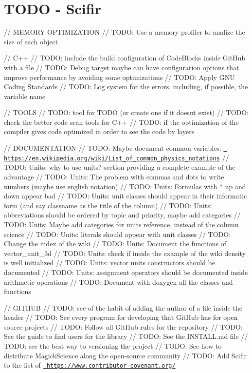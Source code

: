 \chapter{TODO -\/ Scifir}
\hypertarget{md_TODO_01-_01Scifir}{}\label{md_TODO_01-_01Scifir}
// MEMORY OPTIMIZATION // TODO\+: Use a memory profiler to analize the size of each object

// C++ // TODO\+: include the build configuration of Code\+Blocks inside Git\+Hub with a file // TODO\+: Debug target maybe can have configuration options that improve performance by avoiding some optimizations // TODO\+: Apply GNU Coding Standards // TODO\+: Log system for the errors, including, if possible, the variable name

// TOOLS // TODO\+: tool for TODO (or create one if it doesn\textquotesingle{}t exist) // TODO\+: check the better code scan tools for C++ // TODO\+: if the optimization of the compiler gives code optimized in order to see the code by layers

// DOCUMENTATION // TODO\+: Maybe document common variables\+: \href{https://en.wikipedia.org/wiki/List_of_common_physics_notations}{\texttt{ https\+://en.\+wikipedia.\+org/wiki/\+List\+\_\+of\+\_\+common\+\_\+physics\+\_\+notations}} // TODO\+: Units\+: why to use units? section providing a complete example of the advantage // TODO\+: Units\+: The problem with commas and dots to write numbers (maybe use english notation) // TODO\+: Units\+: Formulas with \texorpdfstring{$\ast$}{*} up and down appear bad // TODO\+: Units\+: unit classes should appear in their informatic form (and say classname as the title of the column) // TODO\+: Units\+: abbreviations should be ordered by topic and priority, maybe add categories // TODO\+: Units\+: Maybe add categories for units reference, instead of the column science // TODO\+: Units\+: literals should appear with unit classes // TODO\+: Change the index of the wiki // TODO\+: Units\+: Document the functions of vector\+\_\+unit\+\_\+3d // TODO\+: Units\+: check if inside the example of the wiki density is well initialized // TODO\+: Units\+: vector units constructors should be documented // TODO\+: Units\+: assignment operators should be documented inside arithmetic operations // TODO\+: Document with doxygen all the classes and functions

// GITHUB // TODO\+: see of the habit of adding the author of a file inside the header // TODO\+: See every program for developing that Git\+Hub has for open source projects // TODO\+: Follow all Git\+Hub rules for the repository // TODO\+: See the guide to find users for the library // TODO\+: See the INSTALL.\+md file // TODO\+: see the best way to versioning the project // TODO\+: See how to distribute Magick\+Science along the open-\/source community // TODO\+: Add Scifir to the list of \href{https://www.contributor-covenant.org/}{\texttt{ https\+://www.\+contributor-\/covenant.\+org/}}

